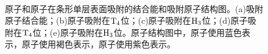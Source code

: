 \begin{figure}[!htb]
{    }\\[-0.5ex]
    \caption{原子和原子在条形单层表面吸附的结合能和吸附原子结构图。(a)吸附原子结合能；(b)原子吸附在$\rm T_{4} \it$位；(c)原子吸附在$\rm H_{3} \it$位；(d)原子吸附在$\rm T_{4} \it$位；(e)原子吸附在$\rm H_{3} \it$位。原子结构图中，原子使用蓝色表示，原子使用褐色表示，原子使用紫色表示。}
    \label{fig:IS_2Linsb_adatom}
\end{figure}


